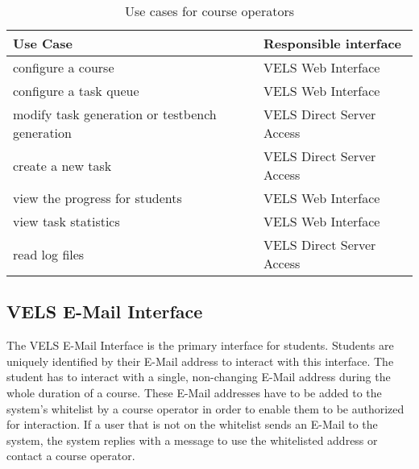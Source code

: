 \begin{table}[h]
\centering
\begin{tabular}{||l | l||} 
    \hline
    Use Case & Responsible interface \\ [0.5ex] 
    \hline\hline
    configure a course & VELS Web Interface
    \\
    \hline
    configure a task queue & VELS Web Interface
    \\
    \hline
    modify task generation or testbench generation & VELS Direct Server Access
    \\
    \hline
    create a new task & VELS Direct Server Access
    \\
    \hline
    view the progress for students & VELS Web Interface
    \\
    \hline
    view task statistics & VELS Web Interface
    \\
    \hline
    read log files & VELS Direct Server Access 
    \\
    \hline
\end{tabular}
\caption{Use cases for course operators}
\label{tab:useoperator}
\end{table}

\newpage

\subsection{VELS E-Mail Interface}\label{emailinterface}
The VELS E-Mail Interface is the primary interface for students. Students are uniquely 
identified by their E-Mail address to interact with this interface. The student has to 
interact with a single, non-changing E-Mail address during the whole duration of a course. 
These E-Mail addresses have to be added to the system's whitelist by a course operator 
in order to enable them to be authorized for interaction. If a user that is not on the 
whitelist sends an E-Mail to the system, the system replies with a message to use the 
whitelisted address or contact a course operator.

